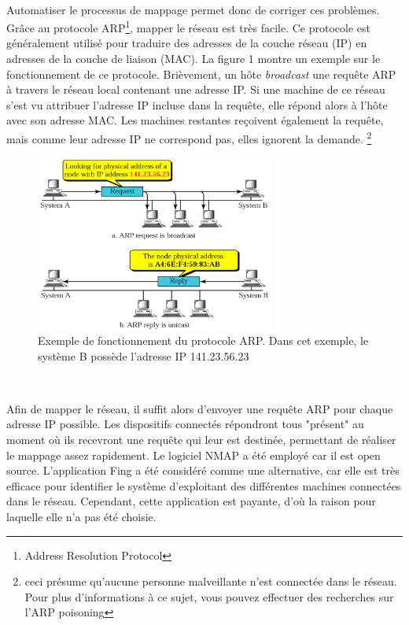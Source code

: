 ~

\noindent
Automatiser le processus de mappage permet donc de corriger ces problèmes. Grâce au protocole ARP\footnote{Address Resolution Protocol}, mapper le réseau est très facile. Ce protocole est généralement utilisé pour traduire des adresses de la couche réseau (IP) en adresses de la couche de liaison (MAC). La figure 1 montre un exemple sur le fonctionnement de ce protocole. Brièvement, un hôte \textit{broadcast} une requête ARP à travers le réseau local contenant une adresse IP. Si une machine de ce réseau s'est vu attribuer l'adresse IP incluse dans la requête, elle répond alors à l'hôte avec son adresse MAC. Les machines restantes reçoivent également la requête, mais comme leur adresse IP ne correspond pas, elles ignorent la demande. \footnote{ceci présume qu'aucune personne malveillante n'est connectée dans le réseau. Pour plus d'informations à ce sujet, vous pouvez effectuer des recherches sur l'ARP poisoning}

\begin{figure}[ht!]
  \centering
  \includegraphics[width=0.7\textwidth]{img/app/arp.png}
  \caption{Exemple de fonctionnement du protocole ARP. Dans cet exemple, le système B possède l'adresse IP 141.23.56.23 \cite{arp_img}}
  \label{fig:arp_ex}
\end{figure}

~

\noindent
Afin de mapper le réseau, il suffit alors d'envoyer une requête ARP pour chaque adresse IP possible. Les dispositifs connectés répondront tous "présent" au moment où ils recevront une requête qui leur est destinée, permettant de réaliser le mappage assez rapidement.  Le logiciel NMAP a été employé car il est open source. L'application Fing \cite{fing_app} a été considéré comme une alternative, car elle est très efficace pour identifier le système d'exploitant des différentes machines connectées dans le réseau. Cependant, cette application est payante, d'où la raison pour laquelle elle n'a pas été choisie.


